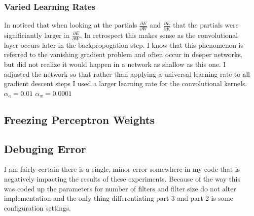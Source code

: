 \documentclass{article}
\begin{document}
\subsubsection{Varied Learning Rates}
In noticed that when looking at the partials $\frac{\partial E}{\partial W}$ and $\frac{\partial E}{\partial K}$ that the partials were significiantly larger in $\frac{\partial E}{\partial W}$.  In retrospect this makes sense as the convolutional layer occurs later in the backpropogation step.  I know that this phenomenon is referred to the vanishing gradient problem and often occur in deeper networks, but did not realize it would happen in a network as shallow as this one.  I adjusted the network so that rather than applying a universal learning rate to all gradient descent steps I used a larger learning rate for the convolutional kernels.
$\alpha_a = 0.01$ $\alpha_w = 0.0001$

\subsection{Freezing Perceptron Weights}



\subsection{Debuging Error}
I am fairly certain there is a single, minor error somewhere in my code that is negatively impacting the results of these experiments.  Because of the way this was coded up the parameters for number of filters and filter size do not alter implementation and the only thing differentiating part 3 and part 2 is some configuration settings.  
\end{document}
